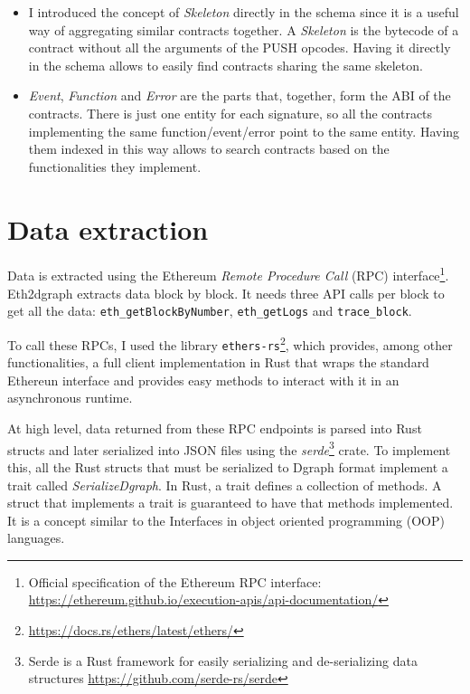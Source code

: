 \begin{itemize}
    \item I introduced the concept of \textit{Skeleton} directly in the schema since it is a useful way of aggregating similar contracts together. A \textit{Skeleton} is the bytecode of a contract without all the arguments of the PUSH opcodes. Having it directly in the schema allows to easily find contracts sharing the same skeleton.

    \item \textit{Event}, \textit{Function} and \textit{Error} are the parts that, together, form the ABI of the contracts. There is just one entity for each signature, so all the contracts implementing the same function/event/error point to the same entity. Having them indexed in this way allows to search contracts based on the functionalities they implement.
    
\end{itemize}

\section{Data extraction}

Data is extracted using the Ethereum \textit{Remote Procedure Call} (RPC) interface\footnote{Official specification of the Ethereum RPC interface: \url{https://ethereum.github.io/execution-apis/api-documentation/}}. Eth2dgraph extracts data block by block. It needs three API calls per block to get all the data: \texttt{eth\_getBlockByNumber}, \texttt{eth\_getLogs} and \texttt{trace\_block}. 

To call these RPCs, I used the library \texttt{ethers-rs}\footnote{\url{https://docs.rs/ethers/latest/ethers/}}, which provides, among other functionalities, a full client implementation in Rust that wraps the standard Ethereun interface and provides easy methods to interact with it in an asynchronous runtime.

At high level, data returned from these RPC endpoints is parsed into Rust structs and later serialized into JSON files using the \textit{serde}\footnote{Serde is a Rust framework for easily serializing and de-serializing data structures \url{https://github.com/serde-rs/serde}} crate. To implement this, all the Rust structs that must be serialized to Dgraph format implement a trait called \textit{SerializeDgraph}. In Rust, a trait defines a collection of methods. A struct that implements a trait is guaranteed to have that methods implemented. It is a concept similar to the Interfaces in object oriented programming (OOP) languages.

